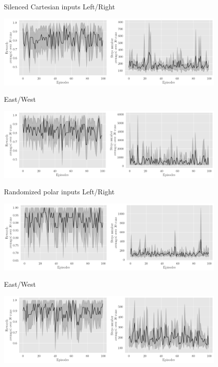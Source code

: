 \documentclass[bigger]{beamer}
\begin{document}
\begin{frame}[label={sec:org7a6918c}]{Silenced Cartesian inputs}
\centering
Left/Right
\begin{center}
\includegraphics[width=0.85\textwidth]{medias/LeftRight/exp_keep-polar_silence-True.png}
\end{center}

East/West
\begin{center}
\includegraphics[width=0.85\textwidth]{medias/EastWest/exp_keep-polar_silence-True.png}
\end{center}
\end{frame}
\begin{frame}[label={sec:org9d78291}]{Randomized polar inputs}
\centering
Left/Right
\begin{center}
\includegraphics[width=0.85\textwidth]{medias/LeftRight/exp_keep-cartesian_silence-False.png}
\end{center}

East/West
\begin{center}
\includegraphics[width=0.85\textwidth]{medias/EastWest/exp_keep-cartesian_silence-False.png}
\end{center}
\end{frame}
\end{document}
